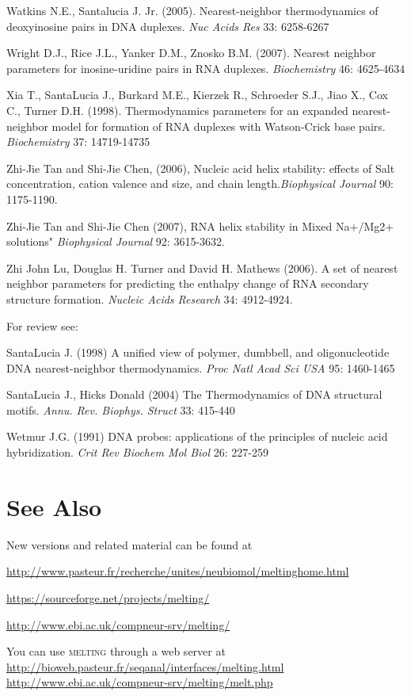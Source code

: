 \documentclass{article}
\begin{document}
Watkins N.E., Santalucia J. Jr. (2005). Nearest-neighbor thermodynamics of deoxyinosine 
pairs in DNA duplexes. \textit{Nuc Acids Res} 33: 6258-6267 

Wright D.J., Rice J.L., Yanker D.M., Znosko B.M. (2007). Nearest neighbor parameters for 
inosine-uridine pairs in RNA duplexes. \textit{Biochemistry} 46: 4625-4634

  Xia T., SantaLucia J., Burkard M.E., Kierzek 
R., Schroeder S.J., Jiao X., Cox C., Turner D.H. (1998). Thermodynamics parameters 
for an expanded nearest-neighbor model for formation of RNA duplexes with 
Watson-Crick base pairs. \textit{Biochemistry}  37: 14719-14735  

Zhi-Jie Tan and Shi-Jie Chen, (2006), Nucleic acid helix stability: effects of Salt 
concentration, cation valence and size, and chain length.\textit{Biophysical Journal}
90: 1175-1190. 

Zhi-Jie Tan and Shi-Jie Chen (2007), RNA helix stability in Mixed Na+/Mg2+ solutions" 
\textit{Biophysical Journal} 92: 3615-3632.

Zhi John Lu, Douglas H. Turner and David H. Mathews (2006). A set of nearest neighbor 
parameters for predicting the enthalpy change of RNA secondary structure formation. 
\textit{Nucleic Acids Research} 34: 4912-4924. 

  For review see: 
  
  SantaLucia J. (1998) A unified view of polymer, dumbbell, and oligonucleotide 
DNA nearest-neighbor thermodynamics. \textit{Proc Natl Acad Sci USA}  95: 1460-1465 

SantaLucia  J., Hicks Donald (2004) The Thermodynamics of DNA structural motifs. 
\textit{Annu. Rev. Biophys. Struct} 33: 415-440 
  
  Wetmur J.G. (1991) DNA probes: applications of the principles of nucleic 
acid hybridization. \textit{Crit Rev Biochem Mol Biol} 26: 227-259   
 
\section{See Also }
New versions and 
related material can be found at 

\url{http://www.pasteur.fr/recherche/unites/neubiomol/meltinghome.html} 

\url{https://sourceforge.net/projects/melting/}

\url{http://www.ebi.ac.uk/compneur-srv/melting/}
  
You can use \textsc{melting} through a web server at 
\url{http://bioweb.pasteur.fr/seqanal/interfaces/melting.html}
\url{http://www.ebi.ac.uk/compneur-srv/melting/melt.php}   
   
\end{document}
